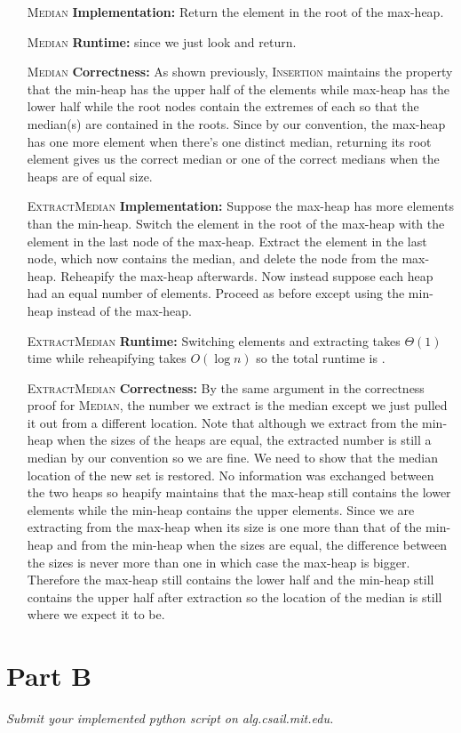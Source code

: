 \documentclass[12pt,twoside]{article}
\begin{document}
\begin{problems}
\begin{itemize}
\begin{itemize}
\item [\textsc{Median}\textbf{ Implementation: }] Return the element in the root of the max-heap. 
\item [\textsc{Median}\textbf{ Runtime: }]  since we just look and return.
\item [\textsc{Median}\textbf{ Correctness: }] As shown previously, \textsc{Insertion} maintains the property that the min-heap has the upper half of the elements while max-heap has the lower half while the root nodes contain the extremes of each so that the median(s) are contained in the roots. Since by our convention, the max-heap has one more element when there's one distinct median, returning its root element gives us the correct median or one of the correct medians when the heaps are of equal size. 
\item [\textsc{ExtractMedian}\textbf{ Implementation: }] Suppose the max-heap has more elements than the min-heap. Switch the element in the root of the max-heap with the element in the last node of the max-heap. Extract the element in the last node, which now contains the median, and delete the node from the max-heap. Reheapify the max-heap afterwards. Now instead suppose each heap had an equal number of elements. Proceed as before except using the min-heap instead of the max-heap.
\item [\textsc{ExtractMedian}\textbf{ Runtime: }] Switching elements and extracting takes $\Theta(1)$ time while reheapifying takes $O(\log n)$ so the total runtime is .
\item [\textsc{ExtractMedian}\textbf{ Correctness: }] By the same argument in  the correctness proof for \textsc{Median}, the number we extract is the median except we just pulled it out from a different location. Note that although we extract from the min-heap when the sizes of the heaps are equal, the extracted number is still a median by our convention so we are fine. We need to show that the median location of the new set is restored. No information was exchanged between the two heaps so heapify maintains that the max-heap still contains the lower elements while the min-heap contains the upper elements. Since we are extracting from the max-heap when its size is one more than that of the min-heap and from the min-heap when the sizes are equal, the difference between the sizes is never more than one in which case the max-heap is bigger. Therefore the max-heap still contains the lower half and the min-heap still contains the upper half after extraction so the location of the median is still where we expect it to be.
\end{itemize}
\end{itemize}

\section*{Part B}

\emph{Submit your implemented python script on alg.csail.mit.edu.}

\end{problems}
\end{document}
